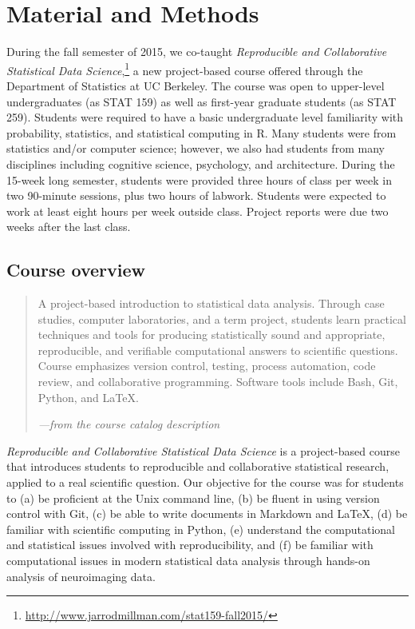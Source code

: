 \section{Material and Methods}\label{methods}

During the fall semester of 2015, we co-taught \emph{Reproducible and Collaborative
Statistical Data Science},\footnote{\url{http://www.jarrodmillman.com/stat159-fall2015/}}
a new project-based course offered through the Department of Statistics at UC Berkeley.
The course was open to upper-level undergraduates (as STAT 159) as well as
first-year graduate students (as STAT 259).
Students were required to have a basic undergraduate level familiarity with
probability, statistics, and statistical computing in R.
Many students were from statistics and/or computer science; however, we also
had students from many disciplines including cognitive science, psychology, and
architecture.
During the 15-week long semester, students were provided three hours of class
per week in two 90-minute sessions, plus two hours of labwork.
Students were expected to work at least eight hours per week outside class.
Project reports were due two weeks after the last class.

\subsection{Course overview}

\begin{quote}
A project-based introduction to statistical data analysis. Through case
studies, computer laboratories, and a term project, students learn
practical techniques and tools for producing statistically sound and
appropriate, reproducible, and verifiable computational answers to
scientific questions. Course emphasizes version control, testing,
process automation, code review, and collaborative programming.
Software tools include Bash, Git, Python, and \LaTeX.

\hfill\emph{---from the course catalog description}
\end{quote}

\emph{Reproducible and Collaborative Statistical Data Science} is a
project-based course that introduces students to reproducible and collaborative
statistical research, applied to a real scientific question.
Our objective for the course was for students to
(a) be proficient at the Unix command line,
(b) be fluent in using version control with Git,
(c) be able to write documents in Markdown and \LaTeX,
(d) be familiar with scientific computing in Python,
(e) understand the computational and statistical issues involved with reproducibility, and
(f) be familiar with computational issues in modern statistical data
analysis through hands-on analysis of neuroimaging data.

